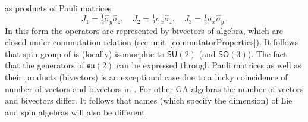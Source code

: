 \begin{example}
as products of Pauli matrices
\[
J_1=\tfrac{1}{2}\hat{\sigma}_y\hat{\sigma}_z,\quad
J_2=\tfrac{1}{2}\hat{\sigma}_x\hat{\sigma}_z,\quad
J_3=\tfrac{1}{2}\hat{\sigma}_x\hat{\sigma}_y \,.
\]
In this form the operators are represented by bivectors of
 algebra, which are closed under commutation relation
(see unit~\ref{commutatorProperties}). It follows that spin group
of  is (locally) isomorphic to $\mathsf{SU}(2)$ (and
$\mathsf{SO}(3)$). The fact that the generators of
$\mathfrak{su}(2)$ can be expressed through Pauli matrices as well
as their products (bivectors) is an exceptional case due to a
lucky coincidence of number of vectors and bivectors in .
For other GA algebras the number of vectors and bivectors differ.
It follows that names (which specify the dimension) of Lie and spin algebras will
also be different.
\end{example}
%
